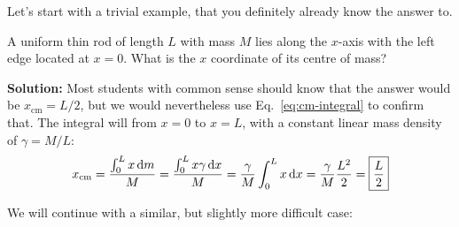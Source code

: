 Let's start with a trivial example, that you definitely already know the
answer to.
\begin{example}
  A uniform thin rod of length $L$ with mass $M$ lies along the $x$-axis with
  the left edge located at $x=0$. What is the $x$ coordinate of its centre of
  mass?
  \begin{center}
  \end{center}
  \textbf{Solution:} Most students with common sense should know that the
  answer would be $x_\text{cm}=L/2$, but we would nevertheless use
  Eq.~\ref{eq:cm-integral} to confirm that. The integral will from $x=0$ to
  $x=L$, with a constant linear mass density of $\gamma=M/L$:
  \begin{equation*}
    x_\text{cm}=\frac{\int_0^Lx\dl m}M=\frac{\int_0^Lx\gamma\dl x}M=
    \frac{\gamma}M\int_0^Lx\dl x=\frac{\gamma}M\frac{L^2}2=\boxed{\frac L2}
  \end{equation*}
\end{example}
We will continue with a similar, but slightly more difficult case:
